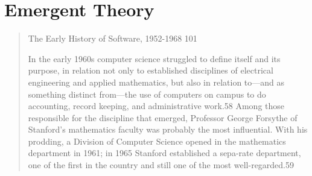 
\section{Emergent Theory}

\begin{quotation}
The Early History of Software, 1952-1968 101

In the early 1960s computer science struggled to define itself and its purpose, 
in relation not only to established disciplines of electrical engineering and 
applied mathematics, but also in relation to—and as something distinct from—the 
use of computers on campus to do accounting, record keeping, and administrative 
work.58 Among those responsible for the discipline that emerged, Professor 
George Forsythe of Stanford's mathematics faculty was probably the most 
influential. With his prodding, a Division of Computer Science opened in the 
mathematics department in 1961; in 1965 Stanford established a sepa-rate 
department, one of the first in the country and still one of the most 
well-regarded.59
\cite{new-history-of-modern-computing}
\end{quotation}
